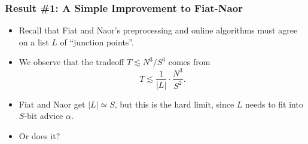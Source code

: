\documentclass[usenames, dvipsnames, t, table]{beamer}
\begin{document}
    \begin{frame}
    \frametitle{Result \#1: A Simple Improvement to Fiat-Naor}
    \begin{itemize}
      \item Recall that Fiat and Naor's preprocessing and online algorithms must agree on a list $L$ of ``junction points''.
         \pause
       \item We observe that the tradeoff $T \lesssim N^3 / S^3$ comes from
         \[T \lesssim \frac{1}{|L|} \cdot \frac{N^3}{S^2}.\] \mypause
       \item Fiat and Naor get $|L|\simeq S$, but this is the hard limit, since $L$ needs to fit into $S$-bit advice $\alpha$.
         \item Or does it?
    \end{itemize}
  \end{frame}
\end{document}
